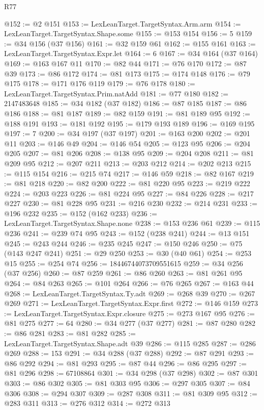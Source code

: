 \begin{lexlean}{R77}
\begin{coremodule}
@152 := @2 @151
@153 := LexLeanTarget.TargetSyntax.Arm.arm
@154 := LexLeanTarget.TargetSyntax.Shape.some
@155 := @153 @154
@156 := 5
@159 := @34 @156 (@37 @156)
@161 := @32 @159 @61
@162 := @155 @161
@163 := LexLeanTarget.TargetSyntax.Expr.let
@164 := 6
@167 := @34 @164 (@37 @164)
@169 := @163 @167 @11
@170 := @82 @44
@171 := @76 @170
@172 := @87 @39
@173 := @86 @172
@174 := @81 @173
@175 := @174 @148
@176 := @79 @175
@178 := @171 @176 @119
@179 := @76 @178
@180 := LexLeanTarget.TargetSyntax.Prim.natAdd
@181 := @77 @180
@182 := 2147483648
@185 := @34 @182 (@37 @182)
@186 := @87 @185
@187 := @86 @186
@188 := @81 @187
@189 := @82 @159
@191 := @81 @189 @95
@192 := @188 @191
@193 := @181 @192
@195 := @179 @193 @189
@196 := @169 @195
@197 := 7
@200 := @34 @197 (@37 @197)
@201 := @163 @200
@202 := @201 @11
@203 := @146 @49
@204 := @146 @54
@205 := @123 @95
@206 := @204 @205
@207 := @81 @206
@208 := @138 @95
@209 := @204 @208
@211 := @81 @209 @95
@212 := @207 @211
@213 := @203 @212
@214 := @202 @213
@215 := @115 @154
@216 := @215 @74
@217 := @146 @59
@218 := @82 @167
@219 := @81 @218
@220 := @82 @200
@222 := @81 @220 @95
@223 := @219 @222
@224 := @203 @223
@226 := @81 @224 @95
@227 := @84 @226
@228 := @217 @227
@230 := @81 @228 @95
@231 := @216 @230
@232 := @214 @231
@233 := @196 @232
@235 := @152 (@162 @233)
@236 := LexLeanTarget.TargetSyntax.Shape.none
@238 := @153 @236 @61
@239 := @115 @236
@241 := @239 @74 @95
@243 := @152 (@238 @241)
@244 := @13 @151
@245 := @243 @244
@246 := @235 @245
@247 := @150 @246
@250 := @75 (@143 @247 @241)
@251 := @29 @250
@253 := @30 (@40 @61)
@254 := @253 @15
@255 := @254 @74
@256 := 18446744073709551615
@259 := @34 @256 (@37 @256)
@260 := @87 @259
@261 := @86 @260
@263 := @81 @261 @95
@264 := @84 @263
@265 := @101 @264
@266 := @76 @265
@267 := @163 @44
@268 := LexLeanTarget.TargetSyntax.Ty.adt
@269 := @268 @39
@270 := @267 @269
@271 := LexLeanTarget.TargetSyntax.Expr.first
@272 := @146 @159
@273 := LexLeanTarget.TargetSyntax.Expr.closure
@275 := @273 @167 @95
@276 := @81 @275
@277 := 64
@280 := @34 @277 (@37 @277)
@281 := @87 @280
@282 := @86 @281
@283 := @81 @282
@285 := LexLeanTarget.TargetSyntax.Shape.adt @39
@286 := @115 @285
@287 := @286 @269
@288 := 153
@291 := @34 @288 (@37 @288)
@292 := @87 @291
@293 := @86 @292
@294 := @81 @293
@295 := @87 @44
@296 := @86 @295
@297 := @81 @296
@298 := 67108864
@301 := @34 @298 (@37 @298)
@302 := @87 @301
@303 := @86 @302
@305 := @81 @303 @95
@306 := @297 @305
@307 := @84 @306
@308 := @294 @307
@309 := @287 @308
@311 := @81 @309 @95
@312 := @283 @311
@313 := @276 @312
@314 := @272 @313

\end{coremodule}
\end{lexlean}
